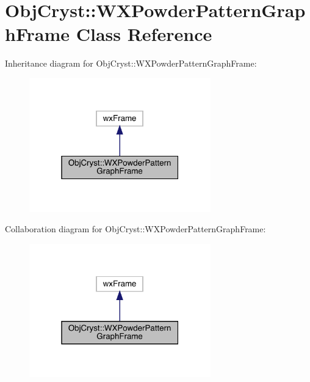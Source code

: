 \hypertarget{class_obj_cryst_1_1_w_x_powder_pattern_graph_frame}{}\section{Obj\+Cryst\+::W\+X\+Powder\+Pattern\+Graph\+Frame Class Reference}
\label{class_obj_cryst_1_1_w_x_powder_pattern_graph_frame}


Inheritance diagram for Obj\+Cryst\+::W\+X\+Powder\+Pattern\+Graph\+Frame\+:
\nopagebreak
\begin{figure}[H]
\begin{center}
\leavevmode
\includegraphics[width=223pt]{class_obj_cryst_1_1_w_x_powder_pattern_graph_frame__inherit__graph}
\end{center}
\end{figure}


Collaboration diagram for Obj\+Cryst\+::W\+X\+Powder\+Pattern\+Graph\+Frame\+:
\nopagebreak
\begin{figure}[H]
\begin{center}
\leavevmode
\includegraphics[width=223pt]{class_obj_cryst_1_1_w_x_powder_pattern_graph_frame__coll__graph}
\end{center}
\end{figure}

